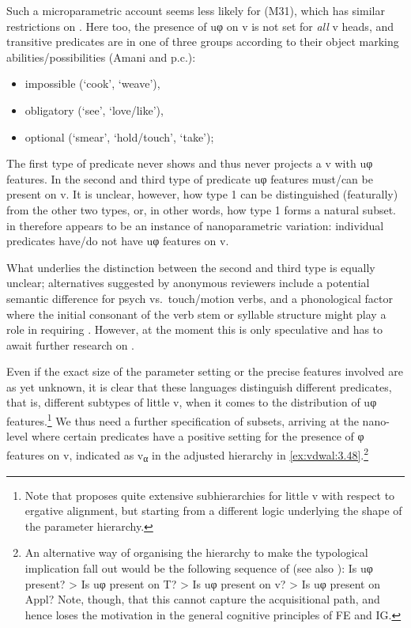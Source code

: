 \documentclass[output=paper]{langsci/langscibook}
\begin{document}
Such a microparametric account seems less likely for  (M31),
which has similar restrictions on  \citep{Lusekelo2012}. Here
too, the presence of uφ on v is not set for \emph{all} v heads, and transitive
predicates are in one of three groups according to their object marking
abilities/possibilities (Amani \citealt{Lusekelo2012} and p.c.):

\begin{itemize}
    \item impossible (‘cook’, ‘weave’),
    \item obligatory (‘see’, ‘love/like’),
    \item optional (‘smear’, ‘hold/touch’, ‘take’);
\end{itemize}

The first type of predicate never shows  and thus never projects
a v with uφ features. In the second and third type of predicate uφ features
must/can be present on v. It is unclear, however, how type 1 can be
distinguished (featurally) from the other two types, or, in other words, how
type 1 forms a natural subset.  in  therefore appears to
be an instance of nanoparametric variation: individual predicates have/do not
have uφ features on v.

What underlies the distinction between the second and third type is equally
unclear; alternatives suggested by anonymous reviewers include a potential
semantic difference for psych vs.\ touch/motion verbs, and a phonological
factor where the initial consonant of the verb stem or syllable structure might
play a role in requiring . However, at the moment this is
only speculative and has to await further research on 
.

Even if the exact size of the parameter setting or the precise features
involved are as yet unknown, it is clear that these languages distinguish
different predicates, that is, different subtypes of little v, when it comes to
the distribution of uφ features.\footnote{Note that
    \textcite{Sheehan2014,Sheehan2017} proposes quite extensive subhierarchies
    for little v with respect to ergative alignment, but
    starting from a different logic underlying the shape of the parameter
hierarchy.} We thus need a further specification of subsets, arriving at the
nano-level where certain predicates have a positive setting for the presence of
φ features on v, indicated as v\textsubscript{α} in the adjusted
hierarchy in \eqref{ex:vdwal:3.48}.\footnote{An alternative way of organising the
    hierarchy to make the typological implication fall out would be the
    following sequence of  (see also \citealt{Barany2015}): Is
    uφ present? > Is uφ present on T? > Is uφ present on v? > Is uφ present on
    Appl? Note, though, that this cannot capture the acquisitional path, and hence loses the motivation in the general cognitive
    principles of \gls{FE} and \gls{IG}.}
\end{document}
